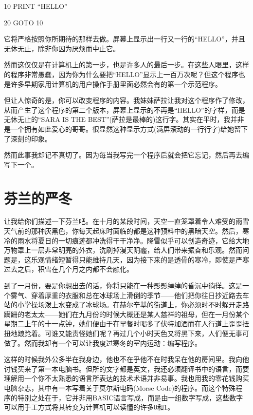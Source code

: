 10 PRINT “HELLO”

20 GOTO 10

 

它将严格按照你所期待的那样去做。屏幕上显示出一行又一行的“HELLO”，并且无休无止，除非你因为厌烦而中止它。

然而这仅仅是在计算机上的第一步，也是许多人的最后一步。在这些人眼里，这样的程序非常愚蠢，因为你为什么要把“HELLO”显示上一百万次呢？但这个程序也是许多早期家用计算机的用户操作手册里面必然会有的第一个示范程序。

但让人惊奇的是，你可以改变程序的内容。我妹妹萨拉让我对这个程序作了修改，从而产生了这个程序的第二个版本，屏幕上显示的不再是“HELLO”的字样，而是无休无止的“SARA IS THE BEST”(萨拉是最棒的)这行字。其实在平时，我并非是一个拥有如此爱心的哥哥。很显然这种显示方式(满屏滚动的一行行字)给她留下了深刻的印象。

然而此事我却记不真切了。因为每当我写完一个程序后就会把它忘记，然后再去编写下一个。

 
\section{芬兰的严冬}

让我给你们描述一下芬兰吧。在十月的某段时间，天空一直笼罩着令人难受的雨雪天气前的那种灰黑色，你每天起床时面临的都是这种预料中的黑暗天空。然后，寒冷的雨水将夏日的一切痕迹都冲洗得干干净净。降雪似乎可以创造奇迹，它给大地万物罩上一层非常明亮的外衣，洗刷掉漫天阴霾，给人们带来振奋和乐观。然而问题是，这乐观情绪短暂得只能维持几天，因为接下来的是透骨的寒冷，即使是严寒过去之后，积雪在几个月之内都不会融化。

到了一月份，要是你想出去的话，你将只能在一种影影绰绰的昏沉中徜徉。这是一个雾气、穿着厚重的衣服和总在冰球场上滑倒的季节——他们把你往日抄近路去车站的小学操场泼上水变成了冰球场。在赫尔辛基的街道上，你必须时不时躲开走路蹒跚的老太太——她们在九月份的时候大概还是某人慈祥的祖母，但在一月份某个星期二上午的十一点钟，她们便由于在早餐时喝多了伏特加酒而在人行道上歪歪扭扭地踉跄着。可谁又能责怪她们呢？再过几个小时天色又将黑下来，人们便无事可做了。然而我却有一个可以让我度过寒冬的室内运动：编写程序。

这样的时候我外公多半在我身边，他也不在乎他不在时我呆在他的房间里。我向他讨钱买来了第一本电脑书。但所的文字都是英文，我还必须翻译书中的语言，而要理解用一个你不太熟悉的语言所表达的技术术语并非易事。我也用我的零花钱购买电脑杂志，其中有一本写着关于莫尔斯电码(Morse Code)的程序。而这个特殊程序的特别之处在于，它并非用BASIC语言写成，而是由一组数字写成，这些数字可以用手工方式将其转变为计算机可以读懂的许多0和1。

